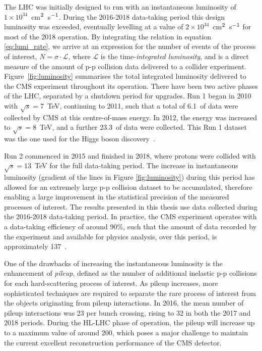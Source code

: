 The LHC was initially designed to run with an instantaneous luminosity of $1\times10^{34}$~cm$^{\rm{2}}$~s$^{\rm{-1}}$. During the 2016-2018 data-taking period this design luminosity was exceeded, eventually levelling at a value of $2 \times 10^{34}$~cm$^{\rm{2}}$~s$^{\rm{-1}}$ for most of the 2018 operation. By integrating the relation in equation \ref{eq:lumi_rate}, we arrive at an expression for the number of events of the process of interest, $N=\sigma\cdot\mathcal{L}$, where $\mathcal{L}$ is the time-\textit{integrated luminosity}, and is a direct measure of the amount of p-p collision data delivered to a collider experiment. Figure~\ref{fig:luminosity} summarises the total integrated luminosity delivered to the CMS experiment throughout its operation. There have been two active phases of the LHC, separated by a shutdown period for upgrades. Run 1 began in 2010 with $\sqrt{s}=7$~TeV, continuing to 2011, such that a total of 6.1~\fbinv of data were collected by CMS at this centre-of-mass energy. In 2012, the energy was increased to $\sqrt{s}=8$~TeV, and a further 23.3~\fbinv of data were collected. This Run 1 dataset was the one used for the Higgs boson discovery~\cite{Aad:2012tfa,Chatrchyan:2012xdj,Chatrchyan:2013lba}. 

Run 2 commenced in 2015 and finished in 2018, where protons were collided with $\sqrt{s}=13$~TeV for the full data-taking period. The increase in instantaneous luminosity (gradient of the lines in Figure \ref{fig:luminosity}) during this period has allowed for an extremely large p-p collision dataset to be accumulated, therefore enabling a large improvement in the statistical precision of the measured processes of interest. The results presented in this thesis use data collected during the 2016-2018 data-taking period. In practice, the CMS experiment operates with a data-taking efficiency of around 90\%, such that the amount of data recorded by the experiment and available for physics analysis, over this period, is approximately 137~\fbinv.

One of the drawbacks of increasing the instantaneous luminosity is the enhancement of \textit{pileup}, defined as the number of additional inelastic p-p collisions for each hard-scattering process of interest. As pileup increases, more sophisticated techniques are required to separate the rare process of interest from the objects originating from pileup interactions. In 2016, the mean number of pileup interactions was 23 per bunch crossing, rising to 32 in both the 2017 and 2018 periods. During the HL-LHC phase of operation, the pileup will increase up to a maximum value of around 200, which poses a major challenge to maintain the current excellent reconstruction performance of the CMS detector.

